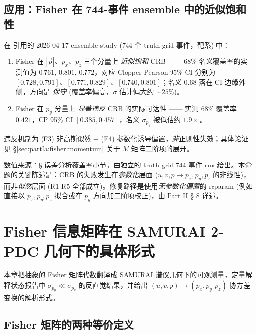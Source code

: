\subsection{应用：Fisher 在 744-事件 ensemble 中的近似饱和性}
\label{sec:partIa:crb:saturation}

\begin{proposition}\label{prop:partIa:saturation}
  在 \StatusReport 引用的 2026-04-17 ensemble study (744 个 truth-grid 事件，靶系) 中：
  \begin{enumerate}[nosep]
    \item Fisher 在 $|\vec p|$、$p_x$、$p_z$ 三个分量上 \emph{近似饱和} CRB —— 68\% 名义覆盖率的实测值为 $0.761,\,0.801,\,0.772$，对应 Clopper-Pearson 95\% CI 分别为 $[0.728,0.791]$、$[0.771,0.829]$、$[0.740,0.801]$；名义 0.68 落在 CI 边缘外侧，方向是 \emph{保守} (覆盖率偏高，$\sigma$ 估计偏大约 $\sim 25\%$)。
    \item Fisher 在 $p_y$ 分量上 \emph{显著违反} CRB 的实际可达性 —— 实测 68\% 覆盖率 $0.421$，CP 95\% CI $[0.385, 0.457]$，名义 $\sigma_{p_y}$ 被低估约 $1.9\times$。
  \end{enumerate}
  违反机制为 (F3) 非高斯似然 + (F4) 参数化诱导偏置，\emph{非}正则性失效；具体论证见 §\ref{sec:partIa:fisher:momentum} 关于 $M$ 矩阵二阶项的展开。
\end{proposition}

数值来源：\StatusReport § 误差分析覆盖率小节，由独立的 truth-grid 744-事件 run 给出。本命题的关键陈述是：CRB 的失败发生在\emph{参数化}层面 ($u,v,p\mapsto p_x,p_y,p_z$ 的非线性)，而非\emph{似然}层面 (R1-R5 全部成立)。修复路径是使用\emph{无参数化偏置}的 reparam (例如直接以 $p_x,p_y,p_z$ 拟合或在 $p_y$ 方向加二阶项校正)，由 Part II § 8 详述。

\section{Fisher 信息矩阵在 SAMURAI 2-PDC 几何下的具体形式}
\label{sec:partIa:fisher}

本章把抽象的 Fisher 矩阵代数翻译成 SAMURAI 谱仪几何下的可观测量，定量解释状态报告中 $\sigma_{p_y}\ll\sigma_{p_x}$ 的反直觉结果，并给出 $(u,v,p)\to(p_x,p_y,p_z)$ 协方差变换的解析形式。

\subsection{Fisher 矩阵的两种等价定义}
\label{sec:partIa:fisher:def}

